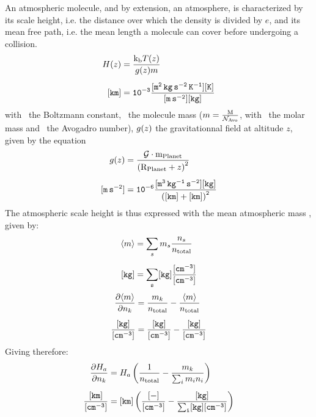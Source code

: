An atmospheric molecule, and by extension, an atmosphere, is characterized by
its scale height, i.e. the distance over which the density is divided by $e$, and
its mean free path, i.e. the mean length a molecule can cover before undergoing
a collision.
\begin{equation}
\begin{split}
H(z)  &    = \frac{\text{k}_\text{b} T(z)}{g(z)m} \\[5pt]
\tt [km] &\tt = 10^{-3} \frac{[\mathtt{m^2\,kg\,s^{-2}\,K^{-1}}] [K]}{[m\,s^{-2}][kg]}
\end{split}
\label{scale_height}
\end{equation}
with \kb\ the Boltzmann constant, 
\mass\ the molecule mass ($m = \frac{\text{M}}{\mathcal{N}_\text{Avo}}$, with
\Mm\ the molar mass and \Nav\ the Avogadro number), 
$g(z)$ the gravitationnal field at altitude $z$, given by the equation
\begin{equation}
\begin{split}
g(z)        &     = \frac{\mathcal{G}\cdot\text{m}_\text{Planet}}{\left(\text{R}_\text{Planet} + z\right)^2} \\[5pt]
\tt [m\,s^{-2}] & \tt = 10^{-6} \frac{[\mathtt{m^3\,kg^{-1}\,s^{-2}}] [kg]}{\left([km] + [km]\right)^2}
\end{split}
\label{gfield}
\end{equation}
%
The atmospheric scale height is thus expressed with the mean atmospheric
mass , given by:
\begin{equation}
\begin{split}
\langle m\rangle & = \sum_s m_s \frac{n_s}{n_\text{total}} \\[5pt]
\tt [kg] & \tt = \sum_s [kg] \frac{[cm^{-3}]}{[cm^{-3}]}
\end{split}
\end{equation}
%
\begin{equation}
\begin{split}
\frac{\partial\langle m\rangle}{\partial n_k} & = \frac{m_k}{n_\text{total}} - \frac{\langle m\rangle}{n_\text{total}}
\\[5pt]
\tt \frac{[kg]}{[cm^{-3}]} & \tt = \frac{[kg]}{[cm^{-3}]} - \frac{[kg]}{[cm^{-3}]}
\end{split}
\end{equation}
%
Giving therefore:
\begin{equation}
\begin{split}
\frac{\partial H_a}{\partial n_k}   &     =  H_a\left(\frac{1}{n_\text{total}} - \frac{m_k}{\sum_im_in_i}\right) \\[5pt]
\tt \frac{[km]}{[cm^{-3}]} & \tt =  [km]\left(\frac{[-]}{[cm^{-3}]} - \frac{[kg]}{\sum_i[kg][cm^{-3}]}\right)
\end{split}
\end{equation}

